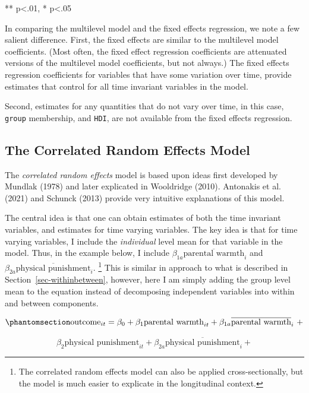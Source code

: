 \documentclass[
  letterpaper,
  DIV=11,
  numbers=noendperiod]{scrreprt}
\begin{document}
** p\textless.01, * p\textless.05

In comparing the multilevel model and the fixed effects regression, we
note a few salient difference. First, the fixed effects are similar to
the multilevel model coefficients. (Most often, the fixed effect
regression coefficients are attenuated versions of the multilevel model
coefficients, but not always.) The fixed effects regression coefficients
for variables that have some variation over time, provide estimates that
control for all time invariant variables in the model.

Second, estimates for any quantities that do not vary over time, in this
case, \texttt{group} membership, and \texttt{HDI}, are not available
from the fixed effects regression.

\subsection{The Correlated Random Effects
Model}\label{the-correlated-random-effects-model}

The \emph{correlated random effects} model is based upon ideas first
developed by Mundlak (1978) and later explicated in Wooldridge (2010).
Antonakis et al. (2021) and Schunck (2013) provide very intuitive
explanations of this model.

The central idea is that one can obtain estimates of both the time
invariant variables, and estimates for time varying variables. The key
idea is that for time varying variables, I include the \emph{individual}
level mean for that variable in the model. Thus, in the example below, I
include \(\beta_{1a}\overline{\text{parental warmth}}_{i}\) and
\(\beta_{2a}\overline{\text{physical punishment}}_{i}\). \footnote{The
  correlated random effects model can also be applied cross-sectionally,
  but the model is much easier to explicate in the longitudinal context.}
This is similar in approach to what is described in
Section~\ref{sec-withinbetween}, however, here I am simply adding the
group level mean to the equation instead of decomposing independent
variables into within and between components.

\begin{equation}\phantomsection\label{eq-CRE}{\text{outcome}_{it} = \beta_0 + \beta_1 \text{parental warmth}_{it} + \beta_{1a}\overline{\text{parental warmth}}_{i} \ + }\end{equation}

\[\beta_2 \text{physical punishment}_{it} + \beta_{2a}\overline{\text{physical punishment}}_{i} + \]
\end{document}
